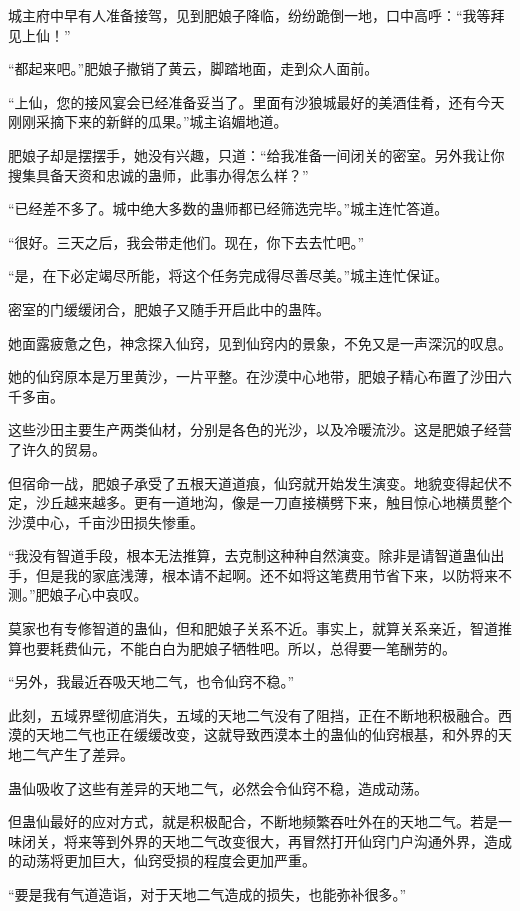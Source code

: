 \begin{this_body}
城主府中早有人准备接驾，见到肥娘子降临，纷纷跪倒一地，口中高呼：“我等拜见上仙！”

“都起来吧。”肥娘子撤销了黄云，脚踏地面，走到众人面前。

“上仙，您的接风宴会已经准备妥当了。里面有沙狼城最好的美酒佳肴，还有今天刚刚采摘下来的新鲜的瓜果。”城主谄媚地道。

肥娘子却是摆摆手，她没有兴趣，只道：“给我准备一间闭关的密室。另外我让你搜集具备天资和忠诚的蛊师，此事办得怎么样？”

“已经差不多了。城中绝大多数的蛊师都已经筛选完毕。”城主连忙答道。

“很好。三天之后，我会带走他们。现在，你下去去忙吧。”

“是，在下必定竭尽所能，将这个任务完成得尽善尽美。”城主连忙保证。

密室的门缓缓闭合，肥娘子又随手开启此中的蛊阵。

她面露疲惫之色，神念探入仙窍，见到仙窍内的景象，不免又是一声深沉的叹息。

她的仙窍原本是万里黄沙，一片平整。在沙漠中心地带，肥娘子精心布置了沙田六千多亩。

这些沙田主要生产两类仙材，分别是各色的光沙，以及冷暖流沙。这是肥娘子经营了许久的贸易。

但宿命一战，肥娘子承受了五根天道道痕，仙窍就开始发生演变。地貌变得起伏不定，沙丘越来越多。更有一道地沟，像是一刀直接横劈下来，触目惊心地横贯整个沙漠中心，千亩沙田损失惨重。

“我没有智道手段，根本无法推算，去克制这种种自然演变。除非是请智道蛊仙出手，但是我的家底浅薄，根本请不起啊。还不如将这笔费用节省下来，以防将来不测。”肥娘子心中哀叹。

莫家也有专修智道的蛊仙，但和肥娘子关系不近。事实上，就算关系亲近，智道推算也要耗费仙元，不能白白为肥娘子牺牲吧。所以，总得要一笔酬劳的。

“另外，我最近吞吸天地二气，也令仙窍不稳。”

此刻，五域界壁彻底消失，五域的天地二气没有了阻挡，正在不断地积极融合。西漠的天地二气也正在缓缓改变，这就导致西漠本土的蛊仙的仙窍根基，和外界的天地二气产生了差异。

蛊仙吸收了这些有差异的天地二气，必然会令仙窍不稳，造成动荡。

但蛊仙最好的应对方式，就是积极配合，不断地频繁吞吐外在的天地二气。若是一味闭关，将来等到外界的天地二气改变很大，再冒然打开仙窍门户沟通外界，造成的动荡将更加巨大，仙窍受损的程度会更加严重。

“要是我有气道造诣，对于天地二气造成的损失，也能弥补很多。”


\end{this_body}
